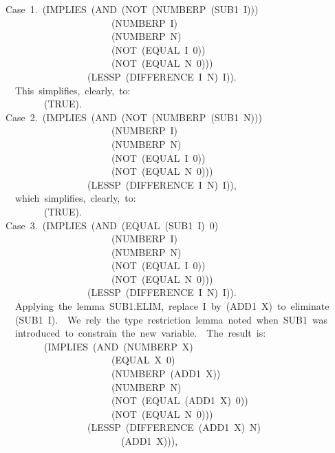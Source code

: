 \documentclass[11pt]{book}
\newenvironment{pubasis}{\begin{flushleft}\ttfamily\small}{\normalsize\rmfamily\end{flushleft}}
\begin{document}
\begin{pubasis}
Case~1.~(IMPLIES~(AND~(NOT~(NUMBERP~(SUB1~I)))\\
~~~~~~~~~~~~~~~~~~~~~~(NUMBERP~I)\\
~~~~~~~~~~~~~~~~~~~~~~(NUMBERP~N)\\
~~~~~~~~~~~~~~~~~~~~~~(NOT~(EQUAL~I~0))\\
~~~~~~~~~~~~~~~~~~~~~~(NOT~(EQUAL~N~0)))\\
~~~~~~~~~~~~~~~~~(LESSP~(DIFFERENCE~I~N)~I)).\\

~~This~simplifies,~clearly,~to:\\

~~~~~~~~(TRUE).\\

Case~2.~(IMPLIES~(AND~(NOT~(NUMBERP~(SUB1~N)))\\
~~~~~~~~~~~~~~~~~~~~~~(NUMBERP~I)\\
~~~~~~~~~~~~~~~~~~~~~~(NUMBERP~N)\\
~~~~~~~~~~~~~~~~~~~~~~(NOT~(EQUAL~I~0))\\
~~~~~~~~~~~~~~~~~~~~~~(NOT~(EQUAL~N~0)))\\
~~~~~~~~~~~~~~~~~(LESSP~(DIFFERENCE~I~N)~I)),\\

~~which~simplifies,~clearly,~to:\\

~~~~~~~~(TRUE).\\

Case~3.~(IMPLIES~(AND~(EQUAL~(SUB1~I)~0)\\
~~~~~~~~~~~~~~~~~~~~~~(NUMBERP~I)\\
~~~~~~~~~~~~~~~~~~~~~~(NUMBERP~N)\\
~~~~~~~~~~~~~~~~~~~~~~(NOT~(EQUAL~I~0))\\
~~~~~~~~~~~~~~~~~~~~~~(NOT~(EQUAL~N~0)))\\
~~~~~~~~~~~~~~~~~(LESSP~(DIFFERENCE~I~N)~I)).\\

~~Applying~the~lemma~SUB1.ELIM,~replace~I~by~(ADD1~X)~to~eliminate\\
~~(SUB1~I).~~We~rely~the~type~restriction~lemma~noted~when~SUB1~was\\
~~introduced~to~constrain~the~new~variable.~~The~result~is:\\

~~~~~~~~(IMPLIES~(AND~(NUMBERP~X)\\
~~~~~~~~~~~~~~~~~~~~~~(EQUAL~X~0)\\
~~~~~~~~~~~~~~~~~~~~~~(NUMBERP~(ADD1~X))\\
~~~~~~~~~~~~~~~~~~~~~~(NUMBERP~N)\\
~~~~~~~~~~~~~~~~~~~~~~(NOT~(EQUAL~(ADD1~X)~0))\\
~~~~~~~~~~~~~~~~~~~~~~(NOT~(EQUAL~N~0)))\\
~~~~~~~~~~~~~~~~~(LESSP~(DIFFERENCE~(ADD1~X)~N)\\
~~~~~~~~~~~~~~~~~~~~~~~~(ADD1~X))),\\


\end{pubasis}
\end{document}
